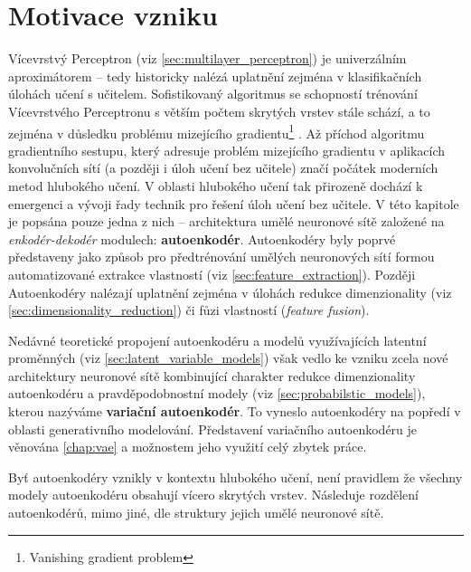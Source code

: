 \section{Motivace vzniku}
Vícevrstvý Perceptron (viz \autoref{sec:multilayer_perceptron})
je univerzálním aproximátorem – tedy historicky nalézá uplatnění zejména v klasifikačních úlohách učení s učitelem.
Sofistikovaný algoritmus se schopností trénování Vícevrstvého Perceptronu s větším počtem skrytých vrstev stále schází, a to zejména v důsledku problému mizejícího gradientu\footnote{Vanishing gradient problem} \cite{Hochreiter1998}.
Až příchod algoritmu gradientního sestupu, který adresuje problém mizejícího gradientu v aplikacích konvolučních sítí \cite{LeCun1989} (a později i úloh učení bez učitele) značí počátek moderních metod hlubokého učení.
V oblasti hlubokého učení tak přirozeně dochází k emergenci a vývoji řady technik pro řešení úloh učení bez učitele.
V této kapitole je popsána pouze jedna z nich – architektura umělé neuronové sítě založené na \emph{enkodér-dekodér} modulech: \textbf{autoenkodér}.
Autoenkodéry byly poprvé představeny jako způsob pro předtrénování umělých neuronových sítí formou automatizované extrakce vlastností (viz \autoref{sec:feature_extraction}). 
Později Autoenkodéry nalézají uplatnění zejména v úlohách redukce dimenzionality (viz \autoref{sec:dimensionality_reduction}) či fůzi vlastností (\emph{feature fusion}). \cite{Charte2018}


Nedávné teoretické propojení autoenkodéru a modelů využívajících latentní proměnných (viz \autoref{sec:latent_variable_models}) však vedlo ke vzniku zcela nové architektury neuronové sítě kombinující charakter redukce dimenzionality autoenkodéru a pravděpodobnostní modely (viz \autoref{sec:probabilstic_models}), kterou nazýváme \textbf{variační autoenkodér}.
To vyneslo autoenkodéry na popředí v oblasti generativního modelování. Představení variačního autoenkodéru je věnována \autoref{chap:vae} a možnostem jeho využití celý zbytek práce.

Byť autoenkodéry vznikly v kontextu hlubokého učení, není pravidlem že všechny modely autoenkodéru obsahují vícero skrytých vrstev. Následuje rozdělení autoenkodérů, mimo jiné, dle struktury jejich umělé neuronové sítě.
